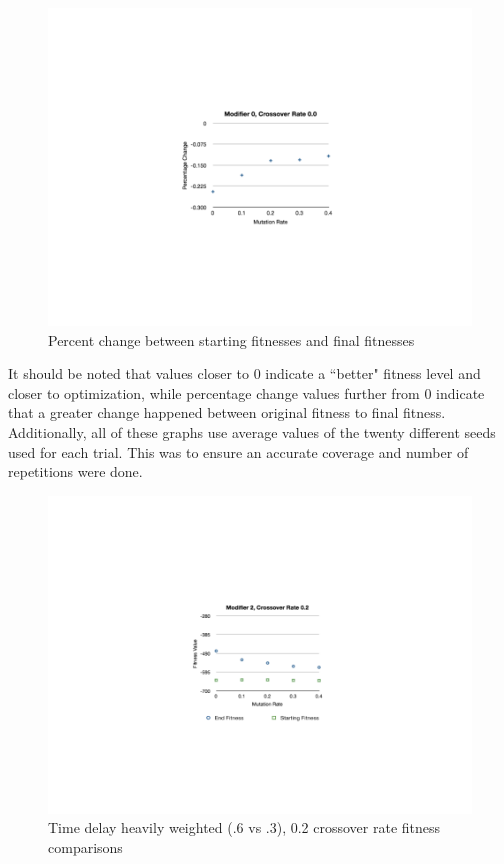 \begin{figure}[h!]
	\hspace*{-2in}\includegraphics[width=10in]{images/FitMute00Percent.png}\hspace*{0in}\vspace*{-2in}
	\caption{Percent change between starting fitnesses and final fitnesses}
	\label{Figure 2}
\end{figure}

\newpage
It should be noted that values closer to 0 indicate a ``better" fitness level and closer to optimization, while percentage change values further from 0 indicate that a greater change happened between original fitness to final fitness.  Additionally, all of these graphs use average values of the twenty different seeds used for each trial.  This was to ensure an accurate coverage and number of repetitions were done.
\vspace*{-2in}
\begin{figure}[h!]	
	\hspace*{-2in}\includegraphics[width=10in]{images/FitMute02.png}\hspace*{0in}\vspace*{-2in}
	\caption{Time delay heavily weighted (.6 vs .3), 0.2 crossover rate fitness comparisons}
	\label{Figure 3}
\end{figure}

